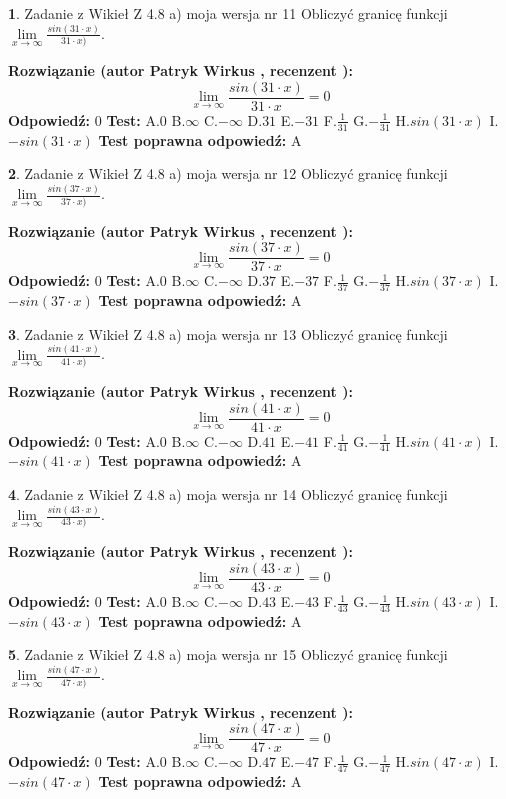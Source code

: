 \documentclass[12pt, a4paper]{article}
\theoremstyle{definition} %
\newtheorem{zad}{}
\newcommand{\zadStart}[1]{\begin{zad}#1\newline}
\newcommand{\zadStop}{\end{zad}}
\newcommand{\rozwStart}[2]{\noindent \textbf{Rozwiązanie (autor #1 , recenzent #2): }\newline}
\newcommand{\rozwStop}{\newline}
\newcommand{\odpStart}{\noindent \textbf{Odpowiedź:}\newline}
\newcommand{\odpStop}{\newline}
\newcommand{\testStart}{\noindent \textbf{Test:}\newline}
\newcommand{\testStop}{\newline}
\newcommand{\kluczStart}{\noindent \textbf{Test poprawna odpowiedź:}\newline}
\newcommand{\kluczStop}{\newline}
\begin{document}
\zadStart{Zadanie z Wikieł Z 4.8 a) moja wersja nr 11}
Obliczyć granicę funkcji $\lim\limits_{x\to \infty}\frac{sin(31\cdot x)}{31\cdot x)}$.
\zadStop
\rozwStart{Patryk Wirkus}{}
$$\lim\limits_{x\to \infty}\frac{sin(31\cdot x)}{31\cdot x}=
0$$
\rozwStop
\odpStart
$0$
\odpStop
\testStart
A.$0$ B.$\infty$ C.$-\infty$ D.$31$ E.$-31$
F.$\frac{1}{31}$ G.$-\frac{1}{31}$
H.$sin(31\cdot x)$
I.$-sin(31\cdot x)$
\testStop
\kluczStart
A
\kluczStop



\zadStart{Zadanie z Wikieł Z 4.8 a) moja wersja nr 12}
Obliczyć granicę funkcji $\lim\limits_{x\to \infty}\frac{sin(37\cdot x)}{37\cdot x)}$.
\zadStop
\rozwStart{Patryk Wirkus}{}
$$\lim\limits_{x\to \infty}\frac{sin(37\cdot x)}{37\cdot x}=
0$$
\rozwStop
\odpStart
$0$
\odpStop
\testStart
A.$0$ B.$\infty$ C.$-\infty$ D.$37$ E.$-37$
F.$\frac{1}{37}$ G.$-\frac{1}{37}$
H.$sin(37\cdot x)$
I.$-sin(37\cdot x)$
\testStop
\kluczStart
A
\kluczStop



\zadStart{Zadanie z Wikieł Z 4.8 a) moja wersja nr 13}
Obliczyć granicę funkcji $\lim\limits_{x\to \infty}\frac{sin(41\cdot x)}{41\cdot x)}$.
\zadStop
\rozwStart{Patryk Wirkus}{}
$$\lim\limits_{x\to \infty}\frac{sin(41\cdot x)}{41\cdot x}=
0$$
\rozwStop
\odpStart
$0$
\odpStop
\testStart
A.$0$ B.$\infty$ C.$-\infty$ D.$41$ E.$-41$
F.$\frac{1}{41}$ G.$-\frac{1}{41}$
H.$sin(41\cdot x)$
I.$-sin(41\cdot x)$
\testStop
\kluczStart
A
\kluczStop



\zadStart{Zadanie z Wikieł Z 4.8 a) moja wersja nr 14}
Obliczyć granicę funkcji $\lim\limits_{x\to \infty}\frac{sin(43\cdot x)}{43\cdot x)}$.
\zadStop
\rozwStart{Patryk Wirkus}{}
$$\lim\limits_{x\to \infty}\frac{sin(43\cdot x)}{43\cdot x}=
0$$
\rozwStop
\odpStart
$0$
\odpStop
\testStart
A.$0$ B.$\infty$ C.$-\infty$ D.$43$ E.$-43$
F.$\frac{1}{43}$ G.$-\frac{1}{43}$
H.$sin(43\cdot x)$
I.$-sin(43\cdot x)$
\testStop
\kluczStart
A
\kluczStop



\zadStart{Zadanie z Wikieł Z 4.8 a) moja wersja nr 15}
Obliczyć granicę funkcji $\lim\limits_{x\to \infty}\frac{sin(47\cdot x)}{47\cdot x)}$.
\zadStop
\rozwStart{Patryk Wirkus}{}
$$\lim\limits_{x\to \infty}\frac{sin(47\cdot x)}{47\cdot x}=
0$$
\rozwStop
\odpStart
$0$
\odpStop
\testStart
A.$0$ B.$\infty$ C.$-\infty$ D.$47$ E.$-47$
F.$\frac{1}{47}$ G.$-\frac{1}{47}$
H.$sin(47\cdot x)$
I.$-sin(47\cdot x)$
\testStop
\kluczStart
A
\kluczStop
\end{document}

